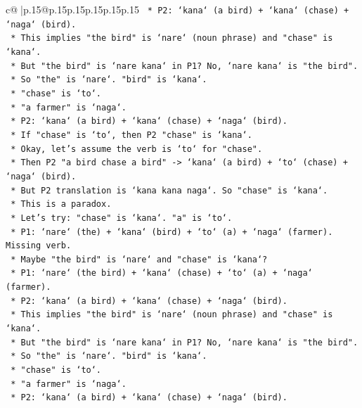 \documentclass{article}
\begin{document}
{\begin{supertabular}{c@{$\;$}|p{.15\linewidth}@{}p{.15\linewidth}p{.15\linewidth}p{.15\linewidth}p{.15\linewidth}p{.15\linewidth}}
{{{\texttt{            *   P2: `kana` (a bird) + `kana` (chase) + `naga` (bird).} \\
\texttt{            *   This implies "the bird" is `nare` (noun phrase) and "chase" is `kana`.} \\
\texttt{            *   But "the bird" is `nare kana` in P1? No, `nare kana` is "the bird".} \\
\texttt{            *   So "the" is `nare`. "bird" is `kana`.} \\
\texttt{            *   "chase" is `to`.} \\
\texttt{            *   "a farmer" is `naga`.} \\
\texttt{            *   P2: `kana` (a bird) + `kana` (chase) + `naga` (bird).} \\
\texttt{            *   If "chase" is `to`, then P2 "chase" is `kana`.} \\
\texttt{            *   Okay, let's assume the verb is `to` for "chase".} \\
\texttt{            *   Then P2 "a bird chase a bird" {-}> `kana` (a bird) + `to` (chase) + `naga` (bird).} \\
\texttt{            *   But P2 translation is `kana kana naga`. So "chase" is `kana`.} \\
\texttt{            *   This is a paradox.} \\
\texttt{            *   Let's try: "chase" is `kana`. "a" is `to`.} \\
\texttt{            *   P1: `nare` (the) + `kana` (bird) + `to` (a) + `naga` (farmer). Missing verb.} \\
\texttt{            *   Maybe "the bird" is `nare` and "chase" is `kana`?} \\
\texttt{            *   P1: `nare` (the bird) + `kana` (chase) + `to` (a) + `naga` (farmer).} \\
\texttt{            *   P2: `kana` (a bird) + `kana` (chase) + `naga` (bird).} \\
\texttt{            *   This implies "the bird" is `nare` (noun phrase) and "chase" is `kana`.} \\
\texttt{            *   But "the bird" is `nare kana` in P1? No, `nare kana` is "the bird".} \\
\texttt{            *   So "the" is `nare`. "bird" is `kana`.} \\
\texttt{            *   "chase" is `to`.} \\
\texttt{            *   "a farmer" is `naga`.} \\
\texttt{            *   P2: `kana` (a bird) + `kana` (chase) + `naga` (bird).} \\
}}}
\end{supertabular}}
\end{document}

